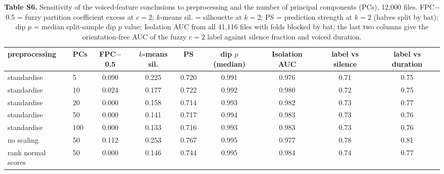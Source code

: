 \begin{table}[htbp]\centering\scriptsize
\caption{\textbf{Table S6.} Sensitivity of the voiced-feature conclusions to preprocessing and the number of principal components (PCs), 12,000 files. FPC$-$0.5 = fuzzy partition coefficient excess at $c=2$; $k$-means sil. = silhouette at $k=2$; PS = prediction strength at $k=2$ (halves split by bat); dip $p$ = median split-sample dip $p$ value; Isolation AUC from all 41,116 files with folds blocked by bat; the last two columns give the orientation-free AUC of the fuzzy $c=2$ label against silence fraction and voiced duration.}\label{tab:S6}
\begin{adjustbox}{max width=\linewidth}
\begin{tabular}{llccccccc}
\toprule
preprocessing & PCs & FPC$-$0.5 & $k$-means sil. & PS & dip $p$ (median) & Isolation AUC & label vs silence & label vs duration \\
\midrule
standardise & 5 & 0.090 & 0.225 & 0.720 & 0.991 & 0.976 & 0.71 & 0.75 \\
standardise & 10 & 0.024 & 0.177 & 0.722 & 0.992 & 0.980 & 0.72 & 0.75 \\
standardise & 20 & 0.000 & 0.158 & 0.714 & 0.993 & 0.982 & 0.73 & 0.77 \\
standardise & 50 & 0.000 & 0.141 & 0.717 & 0.994 & 0.983 & 0.73 & 0.76 \\
standardise & 100 & 0.000 & 0.133 & 0.716 & 0.993 & 0.983 & 0.73 & 0.76 \\
no scaling & 50 & 0.112 & 0.253 & 0.767 & 0.995 & 0.977 & 0.78 & 0.81 \\
rank normal scores & 50 & 0.000 & 0.146 & 0.744 & 0.995 & 0.984 & 0.74 & 0.77 \\
\bottomrule
\end{tabular}
\end{adjustbox}
\end{table}
